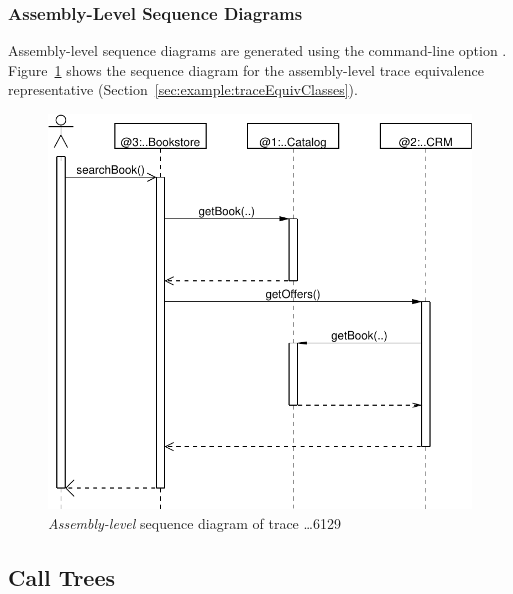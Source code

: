\pagebreak

\subsubsection{Assembly-Level Sequence Diagrams}\label{sec:example:assemblySeqDiagrams}%

Assembly-level sequence diagrams are generated using the command-line option \OPT{\OPTplotAssemblySequenceDiagrams}. %
Figure~\ref{fig:appendix:traceAnalysisExample:SeqDiagrDepl6129} %
shows the sequence diagram for the assembly-level trace equivalence representative %
(Section~\ref{sec:example:traceEquivClasses}).

\begin{figure}[h]\centering
\includegraphics[scale=0.39]{../../examples/userguide/ch5--trace-monitoring-aspectj/testdata/kieker-20100830-082225522-UTC-example-plots/assemblySequenceDiagram-6488138950668976129-crop}
\caption{\textit{Assembly-level} sequence diagram of trace \ldots{}6129}
\label{fig:appendix:traceAnalysisExample:SeqDiagrDepl6129}
\end{figure}


\subsection{Call Trees}\label{sec:example:callTrees}%


